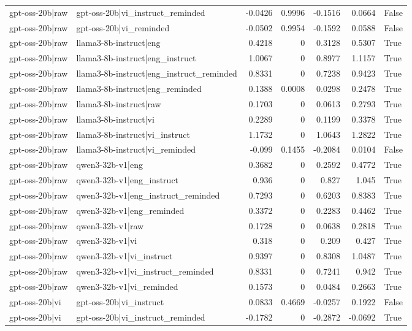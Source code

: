 \begin{table}
\begin{tabular}{l l r r r r l}
gpt-oss-20b|raw & gpt-oss-20b|vi_instruct_reminded & -0.0426 & 0.9996 & -0.1516 & 0.0664 & False \\
gpt-oss-20b|raw & gpt-oss-20b|vi_reminded & -0.0502 & 0.9954 & -0.1592 & 0.0588 & False \\
gpt-oss-20b|raw & llama3-8b-instruct|eng & 0.4218 & 0 & 0.3128 & 0.5307 & True \\
gpt-oss-20b|raw & llama3-8b-instruct|eng_instruct & 1.0067 & 0 & 0.8977 & 1.1157 & True \\
gpt-oss-20b|raw & llama3-8b-instruct|eng_instruct_reminded & 0.8331 & 0 & 0.7238 & 0.9423 & True \\
gpt-oss-20b|raw & llama3-8b-instruct|eng_reminded & 0.1388 & 0.0008 & 0.0298 & 0.2478 & True \\
gpt-oss-20b|raw & llama3-8b-instruct|raw & 0.1703 & 0 & 0.0613 & 0.2793 & True \\
gpt-oss-20b|raw & llama3-8b-instruct|vi & 0.2289 & 0 & 0.1199 & 0.3378 & True \\
gpt-oss-20b|raw & llama3-8b-instruct|vi_instruct & 1.1732 & 0 & 1.0643 & 1.2822 & True \\
gpt-oss-20b|raw & llama3-8b-instruct|vi_reminded & -0.099 & 0.1455 & -0.2084 & 0.0104 & False \\
gpt-oss-20b|raw & qwen3-32b-v1|eng & 0.3682 & 0 & 0.2592 & 0.4772 & True \\
gpt-oss-20b|raw & qwen3-32b-v1|eng_instruct & 0.936 & 0 & 0.827 & 1.045 & True \\
gpt-oss-20b|raw & qwen3-32b-v1|eng_instruct_reminded & 0.7293 & 0 & 0.6203 & 0.8383 & True \\
gpt-oss-20b|raw & qwen3-32b-v1|eng_reminded & 0.3372 & 0 & 0.2283 & 0.4462 & True \\
gpt-oss-20b|raw & qwen3-32b-v1|raw & 0.1728 & 0 & 0.0638 & 0.2818 & True \\
gpt-oss-20b|raw & qwen3-32b-v1|vi & 0.318 & 0 & 0.209 & 0.427 & True \\
gpt-oss-20b|raw & qwen3-32b-v1|vi_instruct & 0.9397 & 0 & 0.8308 & 1.0487 & True \\
gpt-oss-20b|raw & qwen3-32b-v1|vi_instruct_reminded & 0.8331 & 0 & 0.7241 & 0.942 & True \\
gpt-oss-20b|raw & qwen3-32b-v1|vi_reminded & 0.1573 & 0 & 0.0484 & 0.2663 & True \\
gpt-oss-20b|vi & gpt-oss-20b|vi_instruct & 0.0833 & 0.4669 & -0.0257 & 0.1922 & False \\
gpt-oss-20b|vi & gpt-oss-20b|vi_instruct_reminded & -0.1782 & 0 & -0.2872 & -0.0692 & True \\

\end{tabular}
\end{table}
